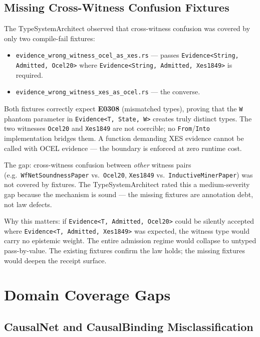 \subsection{Missing Cross-Witness Confusion Fixtures}

The TypeSystemArchitect observed that cross-witness confusion was covered by
only two compile-fail fixtures:

\begin{itemize}
  \item \texttt{evidence\_wrong\_witness\_ocel\_as\_xes.rs} --- passes
    \texttt{Evidence<String, Admitted, Ocel20>} where
    \texttt{Evidence<String, Admitted, Xes1849>} is required.
  \item \texttt{evidence\_wrong\_witness\_xes\_as\_ocel.rs} --- the converse.
\end{itemize}

Both fixtures correctly expect \textbf{E0308} (mismatched types), proving that
the \texttt{W} phantom parameter in \texttt{Evidence<T, State, W>} creates
truly distinct types. The two witnesses \texttt{Ocel20} and \texttt{Xes1849}
are not coercible; no \texttt{From}/\texttt{Into} implementation bridges them.
A function demanding XES evidence cannot be called with OCEL evidence --- the
boundary is enforced at zero runtime cost.

The gap: cross-witness confusion between \emph{other} witness pairs (e.g.\
\texttt{WfNetSoundnessPaper} vs.\ \texttt{Ocel20}, \texttt{Xes1849} vs.\
\texttt{InductiveMinerPaper}) was not covered by fixtures. The TypeSystemArchitect
rated this a medium-severity gap because the mechanism is sound --- the missing
fixtures are annotation debt, not law defects.

Why this matters: if \texttt{Evidence<T, Admitted, Ocel20>} could be silently
accepted where \texttt{Evidence<T, Admitted, Xes1849>} was expected, the
witness type would carry no epistemic weight. The entire admission regime would
collapse to untyped pass-by-value. The existing fixtures confirm the law holds;
the missing fixtures would deepen the receipt surface.

\section{Domain Coverage Gaps}
\label{sec:eval-domain}

\subsection{CausalNet and CausalBinding Misclassification}

